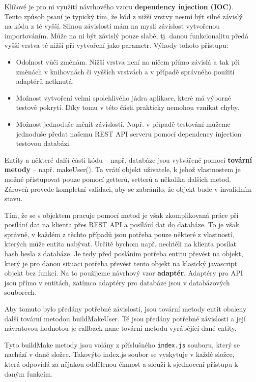 \documentclass[a4paper,oneside,12pt]{report}
\begin{document}
Klíčové je pro ni využití návrhového vzoru \textbf{dependency injection (IOC)}. Tento způsob psaní je typický tím, že kód z nižší vrstvy nesmí být silně závislý na kódu z té vyšší. Silnou závislostí mám na mysli závislost vytvořenou importováním. Může na ni být závislý pouze slabě, tj. danou funkcionalitu předá vyšší vrstva té nižší při vytvoření jako parametr. Výhody tohoto přístupu:

\begin{itemize}
   \item Odolnost vůči změnám. Nižší vrstva není na ničem přímo závislá a tak při změnách v knihovnách či vyšších vrstvách a v případě správného použití adaptérů netknutá.
   \item Možnost vytvoření velmi spolehlivého jádra aplikace, které má výborné testové pokrytí. Díky tomu v této části prakticky nemohou vznikat chyby.
   \item Možnost jednoduše měnit závislosti. Např. v případě testování můžeme jednoduše předat našemu REST API serveru pomocí dependency injection testovou databázi. 
\end{itemize}

Entity a některé další části kódu -- např. databáze jsou vytvářené pomocí \textbf{tovární metody} -- např. makeUser({}). Ta vrátí objekt uživatele, k jehož vlastnostem je možné přistupovat pouze pomocí getterů, setterů a několika dalších metod. Zároveň provede kompletní validaci, aby se zabránilo, že objekt bude v invalidním stavu. 

Tím, že se s objektem pracuje pomocí metod je však zkomplikovaná práce při posílání dat na klienta přes REST API a posílání dat do databáze. To je však správně, v každém z těchto případů jsou potřeba pouze některé z vlastností, kterých může entita nabývat. Určitě bychom např. nechtěli na klienta posílat hash hesla z databáze. Je tedy před posláním potřeba entitu převést na objekt, který je pro danou situaci potřeba převést tento objekt na klasický javascript objekt bez funkcí. Na to použijeme návrhový vzor \textbf{adaptér}. Adaptéry pro API jsou přímo v entitách, zatímco adaptéry pro databáze jsou v databázových souborech.

Aby tomuto bylo předány potřebné závislostí, jsou tovární metody entit obaleny další tovární metodou buildMakeUser. Té jsou předány potřebné závislosti a její návratovou hodnotou je callback nane tovární metodu vyrábějící dané entity.

Tyto buildMake metody jsou volány z příslušného \texttt{index.js} souboru, který se nachází v dané složce. Takovýto index.js soubor se vyskytuje v každé složce, která odpovídá za nějakou oddělenou činnost a slouží k sjednocení přístupu k daným funkcím.  
\end{document}
